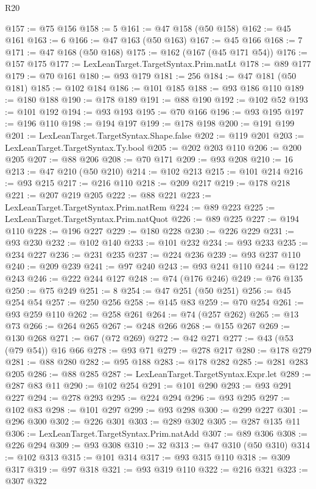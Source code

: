 \begin{lexlean}{R20}
\begin{coremodule}
@157 := @75 @156
@158 := 5
@161 := @47 @158 (@50 @158)
@162 := @45 @161
@163 := 6
@166 := @47 @163 (@50 @163)
@167 := @45 @166
@168 := 7
@171 := @47 @168 (@50 @168)
@175 := @162 (@167 (@45 @171 @54))
@176 := @157 @175
@177 := LexLeanTarget.TargetSyntax.Prim.natLt
@178 := @89 @177
@179 := @70 @161
@180 := @93 @179
@181 := 256
@184 := @47 @181 (@50 @181)
@185 := @102 @184
@186 := @101 @185
@188 := @93 @186 @110
@189 := @180 @188
@190 := @178 @189
@191 := @88 @190
@192 := @102 @52
@193 := @101 @192
@194 := @93 @193
@195 := @70 @166
@196 := @93 @195
@197 := @196 @110
@198 := @194 @197
@199 := @178 @198
@200 := @191 @199
@201 := LexLeanTarget.TargetSyntax.Shape.false
@202 := @119 @201
@203 := LexLeanTarget.TargetSyntax.Ty.bool
@205 := @202 @203 @110
@206 := @200 @205
@207 := @88 @206
@208 := @70 @171
@209 := @93 @208
@210 := 16
@213 := @47 @210 (@50 @210)
@214 := @102 @213
@215 := @101 @214
@216 := @93 @215
@217 := @216 @110
@218 := @209 @217
@219 := @178 @218
@221 := @207 @219 @205
@222 := @88 @221
@223 := LexLeanTarget.TargetSyntax.Prim.natRem
@224 := @89 @223
@225 := LexLeanTarget.TargetSyntax.Prim.natQuot
@226 := @89 @225
@227 := @194 @110
@228 := @196 @227
@229 := @180 @228
@230 := @226 @229
@231 := @93 @230
@232 := @102 @140
@233 := @101 @232
@234 := @93 @233
@235 := @234 @227
@236 := @231 @235
@237 := @224 @236
@239 := @93 @237 @110
@240 := @209 @239
@241 := @97 @240
@243 := @93 @241 @110
@244 := @122 @243
@246 := @222 @244 @127
@248 := @74 (@176 @246)
@249 := @76 @135
@250 := @75 @249
@251 := 8
@254 := @47 @251 (@50 @251)
@256 := @45 @254 @54
@257 := @250 @256
@258 := @145 @83
@259 := @70 @254
@261 := @93 @259 @110
@262 := @258 @261
@264 := @74 (@257 @262)
@265 := @13 @73
@266 := @264 @265
@267 := @248 @266
@268 := @155 @267
@269 := @130 @268
@271 := @67 (@72 @269)
@272 := @42 @271
@277 := @43 (@53 (@79 @54)) @16 @66
@278 := @93 @71
@279 := @278 @217
@280 := @178 @279
@281 := @88 @280
@282 := @95 @188
@283 := @178 @282
@285 := @281 @283 @205
@286 := @88 @285
@287 := LexLeanTarget.TargetSyntax.Expr.let
@289 := @287 @83 @11
@290 := @102 @254
@291 := @101 @290
@293 := @93 @291 @227
@294 := @278 @293
@295 := @224 @294
@296 := @93 @295
@297 := @102 @83
@298 := @101 @297
@299 := @93 @298
@300 := @299 @227
@301 := @296 @300
@302 := @226 @301
@303 := @289 @302
@305 := @287 @135 @11
@306 := LexLeanTarget.TargetSyntax.Prim.natAdd
@307 := @89 @306
@308 := @226 @294
@309 := @93 @308
@310 := 32
@313 := @47 @310 (@50 @310)
@314 := @102 @313
@315 := @101 @314
@317 := @93 @315 @110
@318 := @309 @317
@319 := @97 @318
@321 := @93 @319 @110
@322 := @216 @321
@323 := @307 @322

\end{coremodule}
\end{lexlean}
